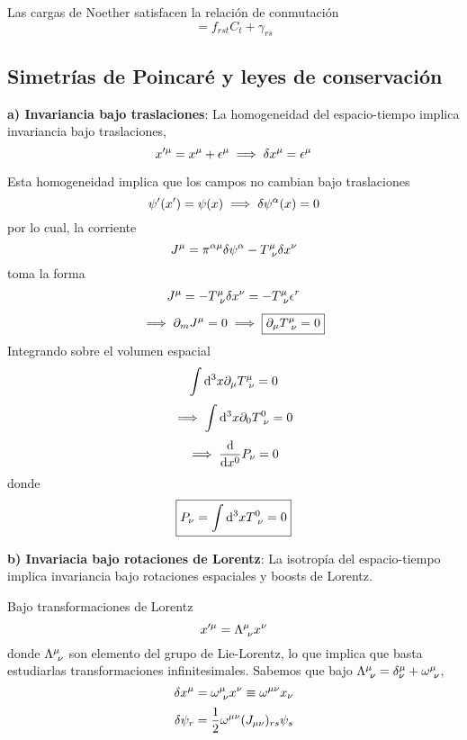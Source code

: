 \begin{teor}
	Las cargas de Noether satisfacen la relación de conmutación
	\begin{equation}
  [C_r,C_s]=f_{rst}C_t+\gamma_{rs}
\end{equation}
\end{teor}

\subsection{Simetrías de Poincaré y leyes de conservación}
\textbf{a) Invariancia bajo traslaciones}: La homogeneidad del espacio-tiempo implica invariancia bajo traslaciones,
\begin{equation}
  x'^\mu =x^\mu +\epsilon^\mu \implies \delta x^\mu =\epsilon^\mu 
\end{equation}

Esta homogeneidad implica que los campos no cambian bajo traslaciones
\begin{equation}
  \psi'(x')=\psi(x)\implies \delta\psi^\alpha (x)=0
\end{equation}
por lo cual, la corriente
\begin{equation}
  J^\mu =\pi^{\alpha\mu }\delta \psi^\alpha -T^{\mu }_{~\nu }\delta x^\nu
\end{equation}
toma la forma
\begin{align}
  J^\mu =-T^{\mu }_{~\nu }\delta x^\nu=-T^{\mu }_{~\nu }\epsilon^r 
\end{align}
\begin{equation}
  \implies \partial_m J^\mu =0\implies \boxed{\partial_\mu T^\mu _{~\nu }=0}
\end{equation}
Integrando sobre el volumen espacial
\begin{equation}
  \int\dd^3x\partial_\mu T^\mu _{~\nu }=0
\end{equation}
\begin{equation}
  \implies \int\dd^3x \partial_0T^0 _{~\nu }=0
\end{equation}
\begin{equation}
  \implies \dv{x^0}P_\nu =0
\end{equation}
donde
\begin{equation}
  \boxed{P_\nu =\int\dd^3x T^0 _{~\nu }=0}
\end{equation}

\textbf{b) Invariacia bajo rotaciones de Lorentz}: La isotropía del espacio-tiempo implica invariancia bajo rotaciones espaciales y boosts de Lorentz.

Bajo transformaciones de Lorentz
\begin{equation}
  x'^\mu =\Lambda^\mu_{~\nu } x^\nu 
\end{equation}
donde $\Lambda^\mu_{~\nu }$ son elemento del grupo de Lie-Lorentz, lo que implica que basta estudiarlas transformaciones infinitesimales.
Sabemos que bajo $\Lambda^\mu_{~\nu }=\delta^\mu_\nu +\omega^\mu_{~\nu } $,
\begin{equation}
  \delta x^\mu =\omega^\mu_{~\nu } x^\nu \equiv \omega^{\mu\nu }x_\nu 
\end{equation}
\begin{equation}
  \delta\psi_r=\frac{1}{2}\omega^{\mu\nu }(J_{\mu\nu })_{rs}\psi_s
\end{equation}

